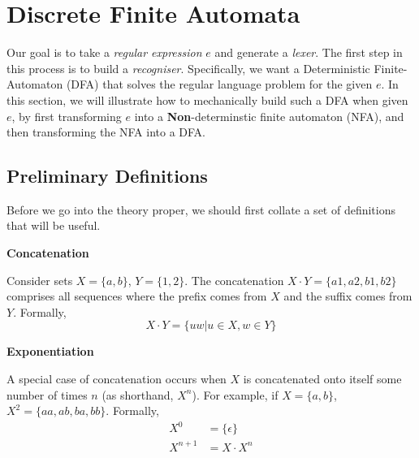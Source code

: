 \section{Discrete Finite Automata}
Our goal is to take a \textit{regular expression} $e$ and generate a \textit{lexer}. The first step in this process is to build a \textit{recogniser}. Specifically, we want a Deterministic Finite-Automaton (DFA) that solves the regular language problem for the given $e$. In this section, we will illustrate how to mechanically build such a DFA when given $e$, by first transforming $e$ into a \textbf{Non}-determinstic finite automaton (NFA), and then transforming the NFA into a DFA.

\makeatletter

\def\*{\@postfix*}

\def\@postfix#1{{#1}\@ifnextchar){}{\;}}

\makeatother

\subsection{Preliminary Definitions}
Before we go into the theory proper, we should first collate a set of definitions that will be useful. 

\begin{minipage}[t]{0.2\textwidth}
    \textbf{\textsf{Concatenation}}
\end{minipage}%
\begin{minipage}[t]{0.8\textwidth}
Consider sets $X = \{a, b\}$, $Y = \{1, 2\}$. The concatenation $X \cdot Y = \{a1, a2, b1, b2\}$ comprises all sequences where the prefix comes from $X$ and the suffix comes from $Y$. Formally, \[X \cdot Y = \{uw | u \in X, w \in Y \}\]
\end{minipage}\par

\begin{minipage}[t]{0.2\textwidth}
    \textbf{\textsf{Exponentiation}}
\end{minipage}%
\begin{minipage}[t]{0.8\textwidth}
A special case of concatenation occurs when $X$ is concatenated onto itself some number of times $n$ (as shorthand, $X^n$). For example, if $X = \{a, b\}$, $X^2 = \{aa, ab, ba, bb\}$. Formally, 
\begin{align*}
    X^{0} &= \{ \epsilon \} \\
    X^{n+1} &= X \cdot X^n
\end{align*}
\end{minipage}\par

